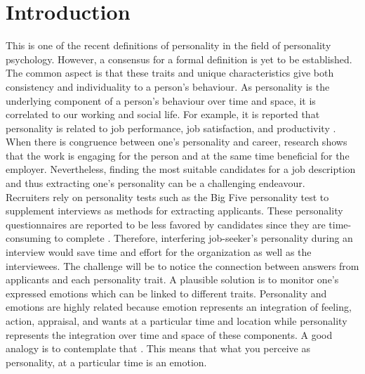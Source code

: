 \chapter{Introduction}
 \cite{personality-definition-BERGNER2020100759} This is one of the recent definitions of personality in the field of personality psychology. However, a consensus for a formal definition is yet to be established. The common aspect is that these traits and unique characteristics give both consistency and individuality to a person's behaviour. As personality is the underlying component of a person's behaviour over time and space, it is correlated to our working and social life. For example, it is reported that personality is related to job performance, job satisfaction, and productivity \cite{personality-prediction-questions-9121971}. When there is congruence between one’s personality and career, research shows that the work is engaging for the person and at the same time beneficial for the employer. Nevertheless, finding the most suitable candidates for a job description and thus extracting one's personality can be a challenging endeavour. \\

Recruiters rely on personality tests such as the Big Five personality test to supplement interviews as methods for extracting applicants. These personality questionnaires are reported to be less favored by candidates since they are time-consuming to complete \cite{personality-prediction-questions-9121971}. Therefore, interfering job-seeker's personality during an interview would save time and effort for the organization as well as the interviewees. The challenge will be to notice the connection between answers from applicants and each personality trait. A plausible solution is to monitor one's expressed emotions  which can be linked to different traits. Personality and emotions are highly related because emotion represents an integration of feeling, action, appraisal, and wants at a particular time and location while personality represents the integration over time and space of these components. A good analogy is to contemplate that  \cite{personality-and-emotion-revelle2009personality}. This means that what you perceive as personality, at a particular time is an emotion.  \\ 

